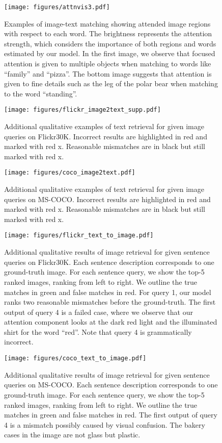 \documentclass[runningheads]{llncs}
\begin{document}
\begin{figure}
\centering
\texttt{[image: figures/attnvis3.pdf]}
\caption{Examples of image-text matching showing attended image regions with respect to each word. The brightness represents the attention strength, which considers the importance
of both regions and words estimated by our model. In the first image, we observe that focused attention is given to multiple objects when matching to words like ``family'' and ``pizza''. The bottom image suggests that attention is given to fine details such as the leg of the polar bear when matching to the word ``standing''.}
\label{fig:attnvis3}
\end{figure}

\begin{figure}[t!]
\centering
\texttt{[image: figures/flickr\_image2text\_supp.pdf]}
\caption{Additional qualitative examples of text retrieval for given image queries on Flickr30K. Incorrect results are highlighted in red and marked with red x. Reasonable mismatches are in black but still marked with red x.}
\label{fig:f30k_txt_ret}
\end{figure}

\begin{figure}[b!]
\centering
\texttt{[image: figures/coco\_image2text.pdf]}
\caption{Additional qualitative examples of text retrieval for given image queries on MS-COCO. Incorrect results are highlighted in red and marked with red x. Reasonable mismatches are in black but still marked with red x.} 
\label{fig:coco_txt_ret}
\end{figure}

\begin{figure}[b!]
\centering
\texttt{[image: figures/flickr\_text\_to\_image.pdf]}
\caption{Additional qualitative results of image retrieval for given sentence queries on Flickr30K. Each sentence description corresponds to one ground-truth image. For each sentence query, we show the top-5 ranked images, ranking from left to right. We outline the true matches in green and false matches in red. For query 1, our model ranks two reasonable mismatches before the ground-truth. The first output of query 4 is a failed case, where we observe that our attention component looks at the dark red light and the illuminated shirt for the word ``red''. Note that query 4 is grammatically incorrect. } 
\label{fig:f30k_im_ret}
\end{figure}

\begin{figure}[b!]
\centering
\texttt{[image: figures/coco\_text\_to\_image.pdf]}
\caption{Additional qualitative results of image retrieval for given sentence queries on MS-COCO. Each sentence description corresponds to one ground-truth image. For each sentence query, we show the top-5 ranked images, ranking from left to right. We outline the true matches in green and false matches in red. The first output of query 4 is a mismatch possibly caused by visual confusion. The bakery cases in the image are not glass but plastic. }
\label{fig:coco_im_ret}
\end{figure}

\clearpage



\end{document}
